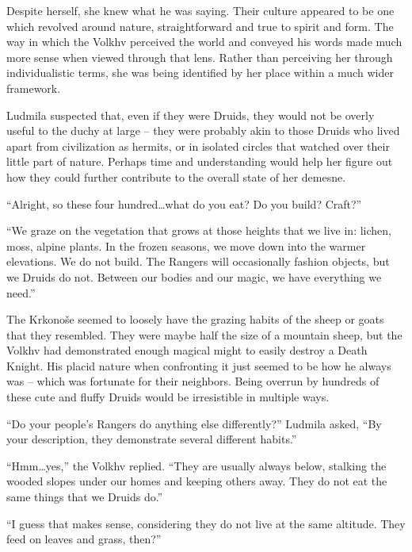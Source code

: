  

Despite herself, she knew what he was saying. Their culture appeared to be one which revolved around nature, straightforward and true to spirit and form. The way in which the Volkhv perceived the world and conveyed his words made much more sense when viewed through that lens. Rather than perceiving her through individualistic terms, she was being identified by her place within a much wider framework.

 

Ludmila suspected that, even if they were Druids, they would not be overly useful to the duchy at large – they were probably akin to those Druids who lived apart from civilization as hermits, or in isolated circles that watched over their little part of nature. Perhaps time and understanding would help her figure out how they could further contribute to the overall state of her demesne.

 

“Alright, so these four hundred…what do you eat? Do you build? Craft?”

 

“We graze on the vegetation that grows at those heights that we live in: lichen, moss, alpine plants. In the frozen seasons, we move down into the warmer elevations. We do not build. The Rangers will occasionally fashion objects, but we Druids do not. Between our bodies and our magic, we have everything we need.”

 

The Krkonoše seemed to loosely have the grazing habits of the sheep or goats that they resembled. They were maybe half the size of a mountain sheep, but the Volkhv had demonstrated enough magical might to easily destroy a Death Knight. His placid nature when confronting it just seemed to be how he always was – which was fortunate for their neighbors. Being overrun by hundreds of these cute and fluffy Druids would be irresistible in multiple ways.

 

“Do your people’s Rangers do anything else differently?” Ludmila asked, “By your description, they demonstrate several different habits.”

 

“Hmm…yes,” the Volkhv replied. “They are usually always below, stalking the wooded slopes under our homes and keeping others away. They do not eat the same things that we Druids do.”

 

“I guess that makes sense, considering they do not live at the same altitude. They feed on leaves and grass, then?”

